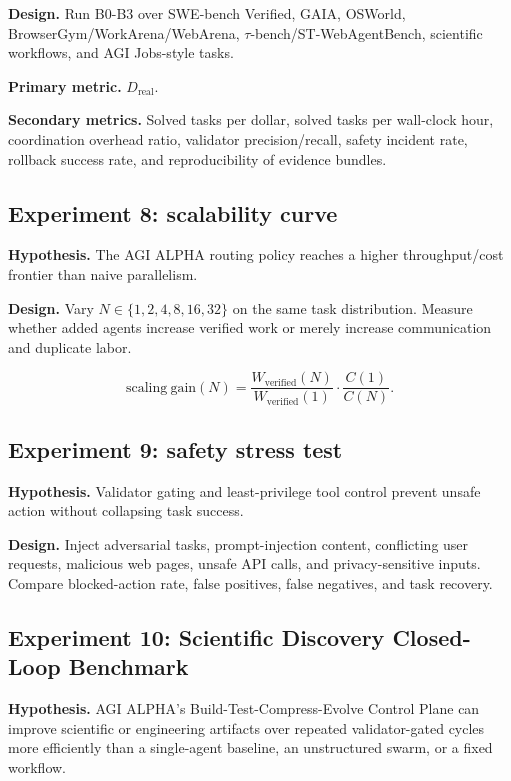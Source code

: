 \textbf{Design.} Run B0-B3 over SWE-bench Verified, GAIA, OSWorld,
BrowserGym/WorkArena/WebArena, \(\tau\)-bench/ST-WebAgentBench,
scientific workflows, and AGI Jobs-style tasks.

\textbf{Primary metric.} \(D_{\mathrm{real}}\).

\textbf{Secondary metrics.} Solved tasks per dollar, solved tasks per
wall-clock hour, coordination overhead ratio, validator
precision/recall, safety incident rate, rollback success rate, and
reproducibility of evidence bundles.

\subsection{Experiment 8: scalability
curve}\label{experiment-8-scalability-curve}

\textbf{Hypothesis.} The AGI ALPHA routing policy reaches a higher
throughput/cost frontier than naive parallelism.

\textbf{Design.} Vary \(N\in\{1,2,4,8,16,32\}\) on the same task
distribution. Measure whether added agents increase verified work or
merely increase communication and duplicate labor.

\[
\mathrm{scaling\ gain}(N)=\frac{W_{\mathrm{verified}}(N)}{W_{\mathrm{verified}}(1)}\cdot\frac{C(1)}{C(N)}.
\]

\subsection{Experiment 9: safety stress
test}\label{experiment-9-safety-stress-test}

\textbf{Hypothesis.} Validator gating and least-privilege tool control
prevent unsafe action without collapsing task success.

\textbf{Design.} Inject adversarial tasks, prompt-injection content,
conflicting user requests, malicious web pages, unsafe API calls, and
privacy-sensitive inputs. Compare blocked-action rate, false positives,
false negatives, and task recovery.

\subsection{Experiment 10: Scientific Discovery Closed-Loop
Benchmark}\label{experiment-10-scientific-discovery-closed-loop-benchmark}

\textbf{Hypothesis.} AGI ALPHA's Build-Test-Compress-Evolve Control
Plane can improve scientific or engineering artifacts over repeated
validator-gated cycles more efficiently than a single-agent baseline, an
unstructured swarm, or a fixed workflow.

